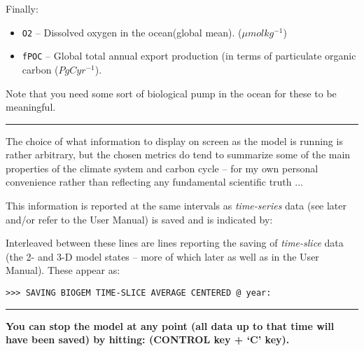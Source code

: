\noindent Finally:

\vspace{1mm}\begin{itemize}
\item[] \texttt{O2} -- Dissolved oxygen in the ocean(global mean). ($\mu mol kg^{-1}$)
\item[] \texttt{fPOC} -- Global total annual export production (in terms of particulate organic carbon ($PgC yr^{-1}$).
\end{itemize}\vspace{1mm}

Note that you need some sort of biological pump in the ocean for these to be meaningful.

\vspace{1mm}\noindent\rule{4cm}{0.5pt}\vspace{2mm}

\noindent The choice of what information to display on screen as the model is running is rather arbitrary, but the chosen metrics do tend to summarize some of the main properties of the climate system and carbon cycle – for my own personal convenience rather than reflecting any fundamental scientific truth ... 

This information is reported at the same intervals as \textit{time-series} data (see later and/or refer to the User Manual) is saved and is indicated by:

Interleaved between these lines are lines reporting the saving of \textit{time-slice} data (the 2- and 3-D model states – more of which later as well as in the User Manual). These appear as:

\vspace{-2mm}\small\begin{verbatim}
>>> SAVING BIOGEM TIME-SLICE AVERAGE CENTERED @ year:
\end{verbatim}\normalsize\vspace{-2mm}

\vspace{1mm}\noindent\rule{4cm}{0.5pt}\vspace{2mm}

\noindent \textbf{You can stop the model at any point (all data up to that time will have been saved) by hitting: \textsf{} (\textsf{\footnotesize CONTROL} key + ‘\textsf{\footnotesize C}’ key).}

